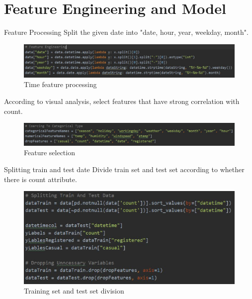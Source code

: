\documentclass[
 size=14pt,
 paper=smartboard,  %
 mode=present, 		%
 display=slides, 	%
 style=tuliplab,  	%
 pauseslide,
 fleqn,leqno]{powerdot}
\begin{document}
\section{Feature Engineering and Model}
\begin{slide}[toc=,bm=]{Feature Processing}
	Split the given date into "date, hour, year, weekday, month".
	\begin{figure}[htbp]
		\includegraphics[scale=0.8]{./figure/1.eps}
		\caption{Time feature processing}
	\end{figure}
	According to visual analysis, select features that have strong correlation with count.
	\begin{figure}[htbp]
		\includegraphics[scale=0.75]{./figure/2.eps}
		\caption{Feature selection}
	\end{figure}
\end{slide}
\begin{slide}[toc=,bm=]{Splitting train and test date}
	Divide train set and test set according to whether there is count attribute.
	\begin{figure}[htbp]
		\includegraphics[scale=1]{./figure/3.eps}
		\caption{Training set and test set division}
	\end{figure}
\end{slide}
\end{document}
